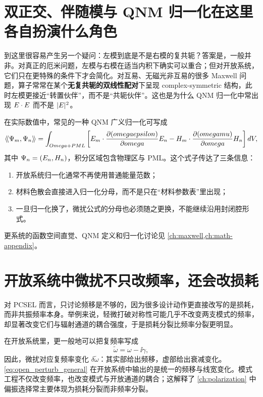 \section{双正交、伴随模与 QNM 归一化在这里各自扮演什么角色}
到这里很容易产生另一个疑问：左模到底是不是右模的复共轭？答案是，一般并非。对真正的厄米问题，左模与右模在适当内积下确实可以重合；但对开放系统，它们只在更特殊的条件下才会简化。对互易、无磁光非互易的很多 Maxwell 问题，算子常常在某个\textbf{无复共轭的双线性配对}下呈现 complex-symmetric 结构，此时左模更接近“转置伙伴”，而不是“共轭伙伴”。这也是为什么 QNM 归一化中常出现 $E\cdot E$ 而不是 $|E|^2$。

在实际数值中，常见的一种 QNM 广义归一化可写成
\begin{equation}
\left\langle\!\left\langle \Psi_m,\Psi_n\right\rangle\!\right\rangle
=
\int_{Omega+PML}
\left[
E_m\cdot \frac{\partial(omegaepsilon)}{\partial omega}E_n
-
H_m\cdot \frac{\partial(omegamu)}{\partial omega}H_n
\right]d V,
\label{eq:qnm_norm_ch11}
\end{equation}
其中 $\Psi_n=(E_n,H_n)$，积分区域包含物理区与 PML。这个式子传达了三条信息：
\begin{enumerate}
  \item 开放系统归一化通常不再使用普通能量范数；
  \item 材料色散会直接进入归一化分母，而不是只在“材料参数表”里出现；
  \item 一旦归一化换了，微扰公式的分母也必须随之更换，不能继续沿用封闭腔形式。
\end{enumerate}

更系统的函数空间直觉、QNM 定义和归一化讨论见 \cref{ch:maxwell,ch:math-appendix}。

\section{开放系统中微扰不只改频率，还会改损耗}
对 PCSEL 而言，只讨论频移是不够的，因为很多设计动作更直接改写的是损耗，而非共振频率本身。举例来说，轻微打破对称性可能几乎不改变两支模式的频率，却显著改变它们与辐射通道的耦合强度，于是损耗分裂比频率分裂更明显。

在开放系统里，更一般地可以把复频率写成
\[
\tilde\omega=\omega-\ii\gamma,
\]
因此，微扰对应复频率变化 $\delta\tilde\omega$：其实部给出频移，虚部给出衰减变化。\cref{eq:open_perturb_general} 在开放系统中输出的是统一的频移与线宽变化。模式工程不仅改变频率，也改变模式与开放通道的耦合；这解释了 \cref{ch:polarization} 中偏振选择常主要体现为损耗分裂而非频率分裂。

